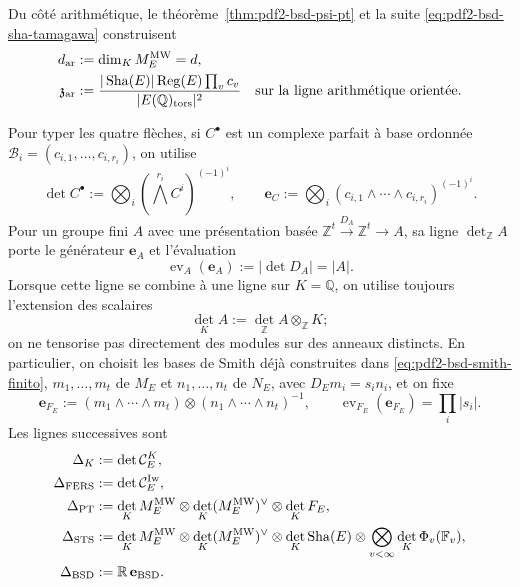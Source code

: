 Du côté arithmétique, le théorème~\ref{thm:pdf2-bsd-psi-pt} et la suite
\eqref{eq:pdf2-bsd-sha-tamagawa} construisent
\begin{equation}\label{eq:pdf2-bsd-dar-zar}
 \begin{aligned}
 d_{\rm ar}&:=\dim_K M_E^{\rm MW}=d,\\
 \mathfrak z_{\rm ar}&:=
 \frac{|\operatorname{Sha}(E)|\operatorname{Reg}(E)\prod_vc_v}
 {|E(\mathbb Q)_{\rm tors}|^2}
 \quad\text{sur la ligne arithmétique orientée}.
 \end{aligned}
\end{equation}

Pour typer les quatre flèches, si $C^\bullet$ est un complexe parfait à
base ordonnée $\mathcal B_i=(c_{i,1},\ldots,c_{i,r_i})$, on utilise
\begin{equation}\label{eq:pdf2-bsd-linea-determinante-base}
 \det C^\bullet:=
 \bigotimes_i\left(\bigwedge^{r_i}C^i\right)^{(-1)^i},
 \qquad
 \mathbf e_C:=\bigotimes_i
 (c_{i,1}\wedge\cdots\wedge c_{i,r_i})^{(-1)^i}.
\end{equation}
Pour un groupe fini $A$ avec une présentation basée
$\mathbb Z^t\xrightarrow{D_A}\mathbb Z^t\to A$, sa ligne
$\det_{\mathbb Z}A$ porte le générateur $\mathbf e_A$ et l'évaluation
\begin{equation}\label{eq:pdf2-bsd-evaluacion-grupo-finito}
 \operatorname{ev}_A(\mathbf e_A):=|\det D_A|=|A|.
\end{equation}
Lorsque cette ligne se combine à une ligne sur $K=\mathbb Q$, on utilise toujours
l'extension des scalaires
\begin{equation}\label{eq:pdf2-bsd-linea-finita-k}
 \det_KA:=\det_{\mathbb Z}A\otimes_{\mathbb Z}K;
\end{equation}
on ne tensorise pas directement des modules sur des anneaux distincts.
En particulier, on choisit les bases de Smith déjà construites dans
\eqref{eq:pdf2-bsd-smith-finito}, $m_1,\ldots,m_t$ de $M_E$ et
$n_1,\ldots,n_t$ de $N_E$, avec $D_Em_i=s_in_i$, et on fixe
\begin{equation}\label{eq:pdf2-bsd-generador-smith-fe}
 \mathbf e_{F_E}:=
 (m_1\wedge\cdots\wedge m_t)\otimes
 (n_1\wedge\cdots\wedge n_t)^{-1},
 \qquad
 \operatorname{ev}_{F_E}(\mathbf e_{F_E})=\prod_i|s_i|.
\end{equation}
Les lignes successives sont
\begin{equation}\label{eq:pdf2-bsd-cinco-lineas-tipadas}
\begin{aligned}
 \Delta_K&:=\det\mathcal C_E^K,\\
 \Delta_{\rm FERS}&:=\det\mathcal C_E^{\rm Iw},\\
 \Delta_{\rm PT}&:=
   \det_K M_E^{\rm MW}\otimes
   \det_K(M_E^{\rm MW})^\vee\otimes\det_KF_E,\\
 \Delta_{\rm STS}&:=
   \det_K M_E^{\rm MW}\otimes
   \det_K(M_E^{\rm MW})^\vee\otimes
   \det_K\operatorname{Sha}(E)
   \otimes\bigotimes_{v<\infty}
      \det_K\Phi_v(\mathbb F_v),\\
 \Delta_{\rm BSD}&:=\mathbb R\,\mathbf e_{\rm BSD}.
\end{aligned}
\end{equation}
